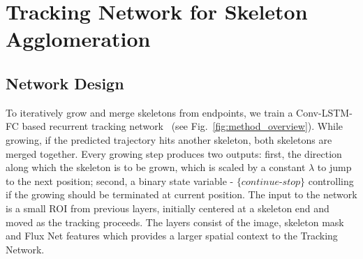 
\section{Tracking Network for Skeleton Agglomeration}

\subsection{Network Design}
To iteratively grow and merge skeletons from endpoints, we train a Conv-LSTM-FC based recurrent tracking network~\cite{Bastani2018,Homayounfar2019,Liang2019} (see Fig.~\ref{fig:method_overview}). While growing, if the predicted trajectory hits another skeleton, both skeletons are merged together. Every growing step produces two outputs: first, the direction along which the skeleton is to be grown, which is scaled by a constant $\lambda$ to jump to the next position; second, a binary state variable - ${\textit{\{continue-stop\}}}$ controlling if the growing should be terminated at current position.  
The input to the network is a small ROI from previous layers, initially centered at a skeleton end and moved as the tracking proceeds. The layers consist of the image, skeleton mask and Flux Net features which provides a larger spatial context to the Tracking Network.

